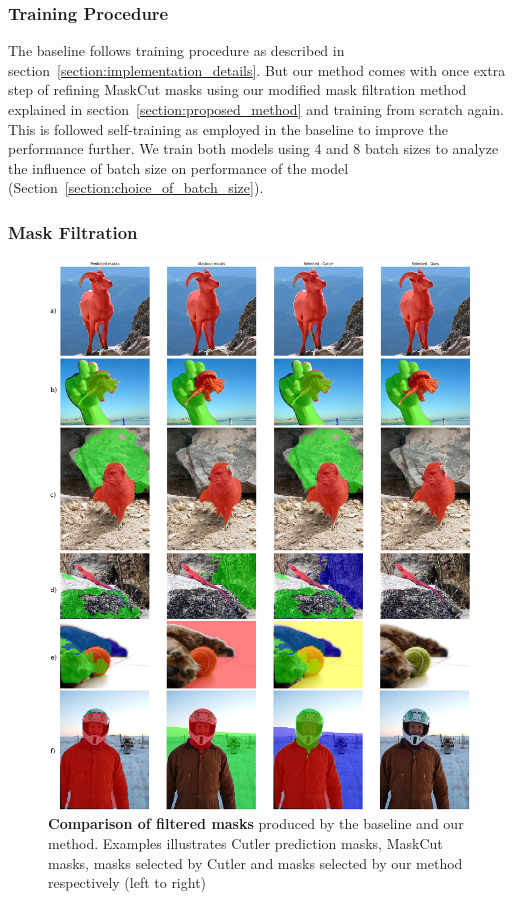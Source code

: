 \subsubsection{Training Procedure}
The baseline follows training procedure as described in section~\ref{section:implementation_details}. But our method comes with once extra step of refining MaskCut masks using our modified mask filtration method explained in section~\ref{section:proposed_method} and training from scratch again. This is followed self-training as employed in the baseline to improve the performance further. We train both models using 4 and 8 batch sizes to analyze the influence of batch size on performance of the model (Section~\ref{section:choice_of_batch_size}). 

\subsubsection{Mask Filtration}

\begin{figure}
	\centering
	\includegraphics[width=1\textwidth]{Images/main/filtered_mask_comparison.png}
	\caption[\textbf{Mask Filtration Outputs - Baseline vs Ours}]{\textbf{Comparison of filtered masks} produced by the baseline and our method. Examples illustrates Cutler prediction masks, MaskCut masks, masks selected by Cutler and masks selected by our method respectively (left to right)}
	\label{fig:filtered_mask_comparison}
\end{figure}


